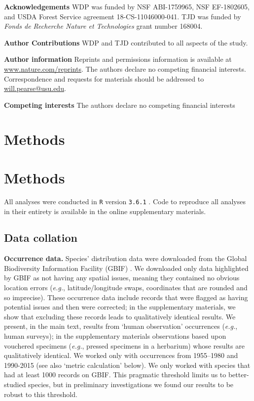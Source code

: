 \documentclass[12pt]{report}
\begin{document}
\clearpage

\textbf{Acknowledgements} WDP was funded by NSF ABI-1759965, NSF
EF-1802605, and USDA Forest Service agreement 18-CS-11046000-041. TJD
was funded by \emph{Fonds de Recherche Nature et Technologies} grant
number 168004.

\textbf{Author Contributions} WDP and TJD contributed to all aspects
of the study.

\textbf{Author information} Reprints and permissions information is
available at \url{www.nature.com/reprints}. The authors declare no
competing financial interests. Correspondence and requests for
materials should be addressed to \url{will.pearse@usu.edu}.

\textbf{Competing interests} The authors declare no competing
financial interests

\clearpage

\section*{\Large Methods}
\section*{\Large Methods}
\renewcommand{\figurename}{Extended Data Figure}
\renewcommand{\tablename}{Extended Data Table}
  
All analyses were conducted in \texttt{R} version \texttt{3.6.1}
\autocite{R2018}. Code to reproduce all analyses in their entirety is
available in the online supplementary materials.

\subsection*{Data collation}

\textbf{Occurrence data.} Species' distribution data were downloaded
from the Global Biodiversity Information Facility (GBIF)
\supercite{url_gbif,url_gbif_occurrences}. We downloaded only data
highlighted by GBIF as not having any spatial issues, meaning they
contained no obvious location errors (\emph{e.g.}, latitude/longitude
swaps, coordinates that are rounded and so imprecise). These occurrence
data include records that were flagged as having potential issues and
then were corrected; in the supplementary materials, we show that
excluding these records leads to qualitatively identical results. We
present, in the main text, results from `human observation'
occurrences (\emph{e.g.}, human surveys); in the supplementary
materials observations based upon vouchered specimens (\emph{e.g.},
pressed specimens in a herbarium) whose results are qualitatively
identical. We worked only with occurrences from 1955--1980 and
1990-2015 (see also `metric calculation' below). We only worked with
species that had at least 1000 records on GBIF. This pragmatic
threshold limits us to better-studied species, but in preliminary
investigations we found our results to be robust to this threshold.
\end{document}
